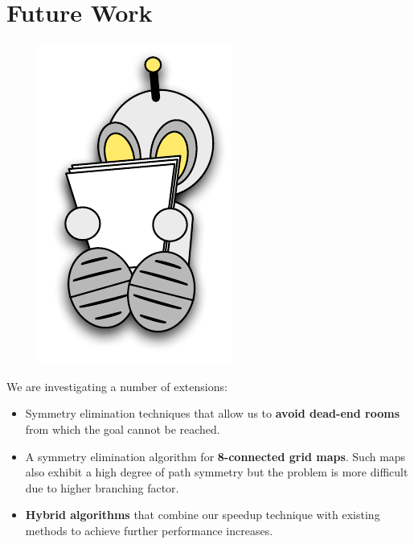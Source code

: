 \section{Future Work}
 \begin{figure}
		\includegraphics[width=0.15\columnwidth]{diagrams/robot_reading.pdf}
 \end{figure}
We are investigating a number of extensions:
\begin{itemize}
\item{Symmetry elimination techniques that allow us to \textbf{avoid dead-end rooms} from which the goal cannot be reached. }
\item{A symmetry elimination algorithm for \textbf{8-connected grid maps}.
Such maps also exhibit a high degree of path symmetry but the problem is more
difficult due to higher branching factor.
}
\item{\textbf{Hybrid algorithms} that combine our speedup technique with existing methods
to achieve further performance increases.}
\end{itemize}

